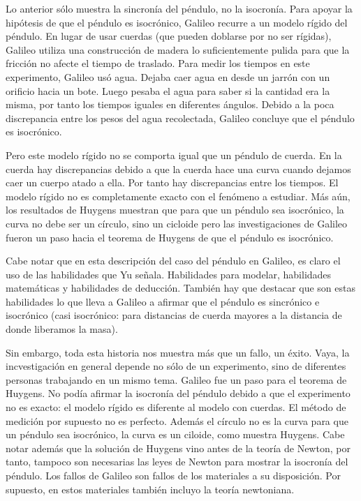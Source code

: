 Lo anterior sólo muestra la sincronía del péndulo, no la isocronía. Para apoyar la hipótesis de que el péndulo es isocrónico, Galileo recurre a un modelo rígido del péndulo. En lugar de usar cuerdas (que pueden doblarse por no ser rígidas), Galileo utiliza una construcción de madera lo suficientemente pulida para que la fricción no afecte el tiempo de traslado. Para medir los tiempos en este experimento, Galileo usó agua. Dejaba caer agua en desde un jarrón con un orificio hacia un bote. Luego pesaba el agua para saber si la cantidad era la misma, por tanto los tiempos iguales en diferentes ángulos. Debido a la poca discrepancia entre los pesos del agua recolectada, Galileo concluye que el péndulo es isocrónico.

Pero este modelo rígido no se comporta igual que un péndulo de cuerda. En la cuerda hay discrepancias debido a que la cuerda hace una curva cuando dejamos caer un cuerpo atado a ella. Por tanto hay discrepancias entre los tiempos. El modelo rígido no es completamente exacto con el fenómeno a estudiar. Más aún, los resultados de Huygens muestran que para que un péndulo sea isocrónico, la curva no debe ser un círculo, sino un cicloide \cite{Ramond2023} pero las investigaciones de Galileo fueron un paso hacia el teorema de Huygens de que el péndulo es isocrónico. 

Cabe notar que en esta descripción del caso del péndulo en Galileo, es claro el uso de las habilidades que Yu señala. Habilidades para modelar, habilidades matemáticas y habilidades de deducción. También hay que destacar que son estas habilidades lo que lleva a Galileo a afirmar que el péndulo es sincrónico e isocrónico (casi isocrónico: para distancias de cuerda mayores a la distancia de donde liberamos la masa). 

Sin embargo, toda esta historia nos muestra más que un fallo, un éxito. Vaya, la incvestigación en general depende no sólo de un experimento, sino de diferentes personas trabajando en un mismo tema. Galileo fue un paso para el teorema de Huygens. No podía afirmar la isocronía del péndulo debido a que el experimento no es exacto: el modelo rígido es diferente al modelo con cuerdas. El método de medición por supuesto no es perfecto. Además el círculo no es la curva para que un péndulo sea isocrónico, la curva es un ciloide, como muestra Huygens. Cabe notar además que la solución de Huygens vino antes de la teoría de Newton, por tanto, tampoco son necesarias las leyes de Newton para mostrar la isocronía del péndulo. Los fallos de Galileo son fallos de los materiales a su disposición. Por supuesto, en estos materiales también incluyo la teoría newtoniana.

